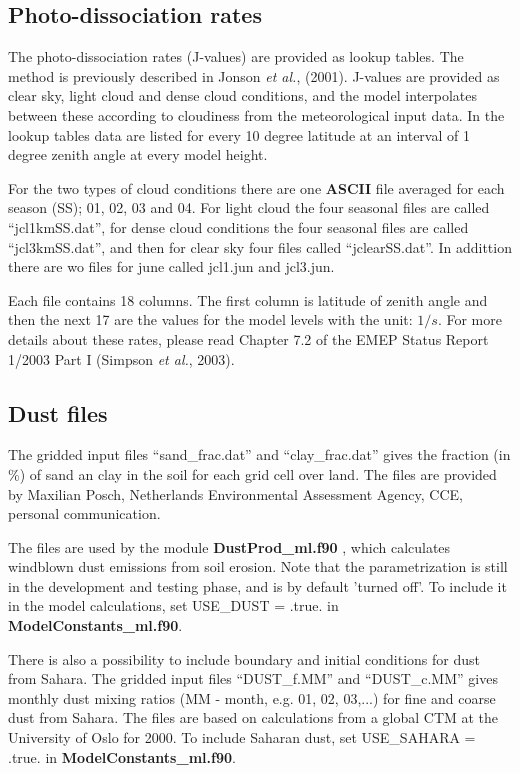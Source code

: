 \subsection{Photo-dissociation rates}
The photo-dissociation rates (J-values) are provided as lookup
tables. The method is previously described in Jonson {\sl et
al.}, (2001). J-values are provided as clear sky, light cloud and dense
cloud conditions, and the model interpolates between these according
to cloudiness from the meteorological input data. In the lookup tables
data are listed for every 10 degree latitude at an interval of 1
degree zenith angle at every model height.

For the two types of cloud conditions there are one {\bf ASCII} file 
averaged for each season (SS); 01, 02, 03 and 04. 
For light cloud the four seasonal files are called ``jcl1kmSS.dat'', for dense cloud conditions
the four seasonal files are called ``jcl3kmSS.dat'', and then for clear sky four files 
called ``jclearSS.dat''. In addittion there are wo files for june called jcl1.jun 
and jcl3.jun.

Each file contains 18 columns. The first column is latitude of zenith 
angle and then the
next 17 are the values for the model levels with the unit: $1/s$. 
For more details about these rates, please read Chapter 7.2 of the EMEP
Status Report 1/2003 Part I (Simpson {\sl et al.}, 2003).

\subsection{Dust files}

The gridded input files ``sand\_frac.dat'' and ``clay\_frac.dat'' gives the fraction (in \%)  
of sand an clay in the soil for each grid cell over land. The files are provided by 
Maxilian Posch, Netherlands Environmental Assessment Agency, CCE, personal communication.

The files are used by the module {\bf DustProd\_ml.f90 }, which calculates windblown dust 
emissions from soil erosion. Note that the parametrization is still in the development and 
testing phase, and is by default 'turned off'. To include it in the model calculations, set 
USE\_DUST = .true. in {\bf ModelConstants\_ml.f90}.

There is also a possibility to include boundary and initial conditions for dust from Sahara. 
The gridded input files ``DUST\_f.MM'' and ``DUST\_c.MM'' gives monthly dust mixing 
ratios (MM - month, e.g. 01, 02, 03,...) for fine and coarse dust from Sahara. The files are based on calculations 
from a global CTM at the University of Oslo for 2000. 
To include Saharan dust, set USE\_SAHARA = .true. in {\bf ModelConstants\_ml.f90}.



